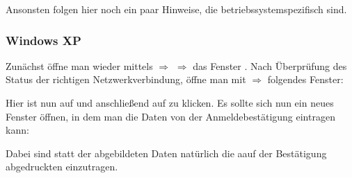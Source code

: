 \documentclass[12pt,titlepage,twoside]{scrartcl}
\newcommand{\centergraphics}[2][]{
\begin{center}
\texttt{[image: \#2]}
\end{center}
}
\begin{document}
Ansonsten folgen hier noch ein paar Hinweise, die betriebssystemspezifisch
sind.
\subsubsection{Windows XP}
Zunächst öffne man wieder mittels  $\Rightarrow$
 $\Rightarrow$  das Fenster
. Nach Überprüfung des Status der richtigen
Netzwerkverbindung, öffne man mit  $\Rightarrow$
 folgendes Fenster:

Hier ist nun auf  und anschließend
auf  zu klicken. Es sollte sich nun ein neues
Fenster öffnen, in dem man die Daten von der Anmeldebestätigung
eintragen kann:

Dabei sind statt der abgebildeten Daten natürlich die aauf der
Bestätigung abgedruckten
einzutragen. 





\end{document}
